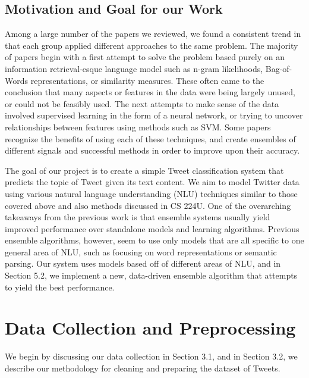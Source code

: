 \documentclass[11pt]{article}
\begin{document}
\subsection{Motivation and Goal for our Work}

Among a large number of the papers we reviewed, we found a consistent trend in that each group applied different approaches to the same problem. The majority of papers begin with a first attempt to solve the problem based purely on an information retrieval-esque language model such as n-gram likelihoods, Bag-of-Words representations, or similarity measures. These often came to the conclusion that many aspects or features in the data were being largely unused, or could not be feasibly used. The next attempts to make sense of the data involved supervised learning in the form of a neural network, or trying to uncover relationships between features using methods such as SVM. Some papers recognize the benefits of using each of these techniques, and create ensembles of different signals and successful methods in order to improve upon their accuracy.

The goal of our project is to create a simple Tweet classification system that predicts the topic of Tweet given its text content. We aim to model Twitter data using various natural language understanding (NLU) techniques similar to those covered above and also methods discussed in CS 224U.  One of the overarching takeaways from the previous work is that ensemble systems usually yield improved performance over standalone models and learning algorithms. Previous ensemble algorithms, however, seem to use only models that are all specific to one general area of NLU, such as focusing on word representations or semantic parsing. Our system uses models based off of different areas of NLU, and in Section 5.2, we implement a new, data-driven ensemble algorithm that attempts to yield the best performance.

\section{Data Collection and Preprocessing}

We begin by discussing our data collection in Section 3.1, and in Section 3.2, we describe our methodology for cleaning and preparing the dataset of Tweets.
\end{document}
